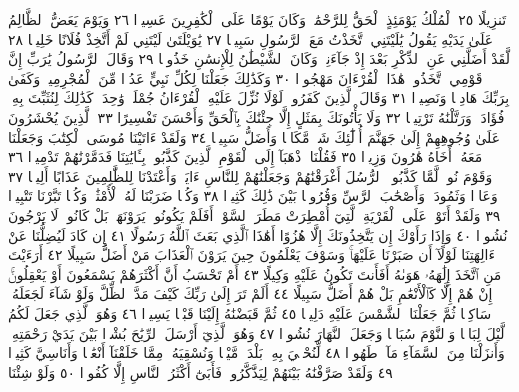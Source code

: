 تَنزِيلًا ٢٥ ٱلْمُلْكُ يَوْمَئِذٍ ٱلْحَقُّ لِلرَّحْمَٰنِۚ وَكَانَ يَوْمًا عَلَى
ٱلْكَٰفِرِينَ عَسِيرࣰا ٢٦ وَيَوْمَ يَعَضُّ ٱلظَّالِمُ عَلَىٰ يَدَيْهِ يَقُولُ
يَٰلَيْتَنِي ٱتَّخَذْتُ مَعَ ٱلرَّسُولِ سَبِيلࣰا ٢٧ يَٰوَيْلَتَىٰ لَيْتَنِي لَمْ
أَتَّخِذْ فُلَانًا خَلِيلࣰا ٢٨ لَّقَدْ أَضَلَّنِي عَنِ ٱلذِّكْرِ بَعْدَ إِذْ جَآءَنِيۗ
وَكَانَ ٱلشَّيْطَٰنُ لِلْإِنسَٰنِ خَذُولࣰا ٢٩ وَقَالَ ٱلرَّسُولُ يَٰرَبِّ
إِنَّ قَوْمِي ٱتَّخَذُوا۟ هَٰذَا ٱلْقُرْءَانَ مَهْجُورࣰا ٣٠ وَكَذَٰلِكَ
جَعَلْنَا لِكُلِّ نَبِيٍّ عَدُوࣰّا مِّنَ ٱلْمُجْرِمِينَۗ وَكَفَىٰ بِرَبِّكَ هَادِيࣰا
وَنَصِيرࣰا ٣١ وَقَالَ ٱلَّذِينَ كَفَرُوا۟ لَوْلَا نُزِّلَ عَلَيْهِ ٱلْقُرْءَانُ جُمْلَةࣰ
وَٰحِدَةࣰۚ كَذَٰلِكَ لِنُثَبِّتَ بِهِۦ فُؤَادَكَۖ وَرَتَّلْنَٰهُ تَرْتِيلࣰا ٣٢
وَلَا يَأْتُونَكَ بِمَثَلٍ إِلَّا جِئْنَٰكَ بِٱلْحَقِّ وَأَحْسَنَ تَفْسِيرًا ٣٣
ٱلَّذِينَ يُحْشَرُونَ عَلَىٰ وُجُوهِهِمْ إِلَىٰ جَهَنَّمَ أُو۟لَٰٓئِكَ
شَرࣱّ مَّكَانࣰا وَأَضَلُّ سَبِيلࣰا ٣٤ وَلَقَدْ ءَاتَيْنَا مُوسَى ٱلْكِتَٰبَ
وَجَعَلْنَا مَعَهُۥٓ أَخَاهُ هَٰرُونَ وَزِيرࣰا ٣٥ فَقُلْنَا ٱذْهَبَآ
إِلَى ٱلْقَوْمِ ٱلَّذِينَ كَذَّبُوا۟ بِـَٔايَٰتِنَا فَدَمَّرْنَٰهُمْ تَدْمِيرࣰا ٣٦
وَقَوْمَ نُوحࣲ لَّمَّا كَذَّبُوا۟ ٱلرُّسُلَ أَغْرَقْنَٰهُمْ وَجَعَلْنَٰهُمْ لِلنَّاسِ
ءَايَةࣰۖ وَأَعْتَدْنَا لِلظَّٰلِمِينَ عَذَابًا أَلِيمࣰا ٣٧ وَعَادࣰا وَثَمُودَا۟
وَأَصْحَٰبَ ٱلرَّسِّ وَقُرُونَۢا بَيْنَ ذَٰلِكَ كَثِيرࣰا ٣٨ وَكُلࣰّا
ضَرَبْنَا لَهُ ٱلْأَمْثَٰلَۖ وَكُلࣰّا تَبَّرْنَا تَتْبِيرࣰا ٣٩ وَلَقَدْ أَتَوْا۟ عَلَى
ٱلْقَرْيَةِ ٱلَّتِيٓ أُمْطِرَتْ مَطَرَ ٱلسَّوْءِۚ أَفَلَمْ يَكُونُوا۟ يَرَوْنَهَاۚ
بَلْ كَانُوا۟ لَا يَرْجُونَ نُشُورࣰا ٤٠ وَإِذَا رَأَوْكَ إِن يَتَّخِذُونَكَ
إِلَّا هُزُوًا أَهَٰذَا ٱلَّذِي بَعَثَ ٱللَّهُ رَسُولًا ٤١ إِن كَادَ
لَيُضِلُّنَا عَنْ ءَالِهَتِنَا لَوْلَآ أَن صَبَرْنَا عَلَيْهَاۚ وَسَوْفَ
يَعْلَمُونَ حِينَ يَرَوْنَ ٱلْعَذَابَ مَنْ أَضَلُّ سَبِيلًا ٤٢ أَرَءَيْتَ
مَنِ ٱتَّخَذَ إِلَٰهَهُۥ هَوَىٰهُ أَفَأَنتَ تَكُونُ عَلَيْهِ وَكِيلًا ٤٣
أَمْ تَحْسَبُ أَنَّ أَكْثَرَهُمْ يَسْمَعُونَ أَوْ يَعْقِلُونَۚ إِنْ هُمْ إِلَّا
كَٱلْأَنْعَٰمِ بَلْ هُمْ أَضَلُّ سَبِيلًا ٤٤ أَلَمْ تَرَ إِلَىٰ رَبِّكَ كَيْفَ مَدَّ ٱلظِّلَّ
وَلَوْ شَآءَ لَجَعَلَهُۥ سَاكِنࣰا ثُمَّ جَعَلْنَا ٱلشَّمْسَ عَلَيْهِ دَلِيلࣰا ٤٥
ثُمَّ قَبَضْنَٰهُ إِلَيْنَا قَبْضࣰا يَسِيرࣰا ٤٦ وَهُوَ ٱلَّذِي جَعَلَ لَكُمُ
ٱلَّيْلَ لِبَاسࣰا وَٱلنَّوْمَ سُبَاتࣰا وَجَعَلَ ٱلنَّهَارَ نُشُورࣰا ٤٧ وَهُوَ
ٱلَّذِيٓ أَرْسَلَ ٱلرِّيَٰحَ بُشْرَۢا بَيْنَ يَدَيْ رَحْمَتِهِۦۚ وَأَنزَلْنَا مِنَ
ٱلسَّمَآءِ مَآءࣰ طَهُورࣰا ٤٨ لِّنُحْـِۧيَ بِهِۦ بَلْدَةࣰ مَّيْتࣰا وَنُسْقِيَهُۥ
مِمَّا خَلَقْنَآ أَنْعَٰمࣰا وَأَنَاسِيَّ كَثِيرࣰا ٤٩ وَلَقَدْ صَرَّفْنَٰهُ بَيْنَهُمْ
لِيَذَّكَّرُوا۟ فَأَبَىٰٓ أَكْثَرُ ٱلنَّاسِ إِلَّا كُفُورࣰا ٥٠ وَلَوْ شِئْنَا
